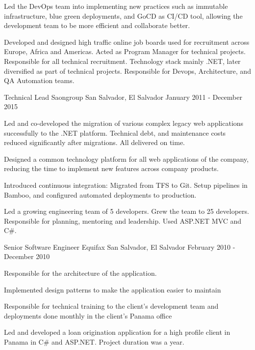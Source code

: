 \begin{cventries}
{\begin{cvitems}
        \item {Led the DevOps team into implementing new practices such as immutable infrastructure, blue green deployments, and GoCD as CI/CD tool, allowing the development team to be more efficient and collaborate better. }
      \end{cvitems}
    }
    {
      \begin{cventrysummary} %
        Developed and designed high traffic online job boards used for recruitment across Europe, Africa and Americas. Acted as Program Manager for technical projects. Responsible for all technical recruitment. Technology stack mainly .NET, later diversified as part of technical projects. Responsible for Devops, Architecture, and QA Automation teams.
      \end{cventrysummary}
    }

  \cventry
    {Technical Lead} %
    {Saongroup}
    {San Salvador, El Salvador}
    {January 2011 - December 2015} %
    {
      \begin{cvitems}
        \item {Led and co-developed the migration of various complex legacy web applications successfully to the .NET platform. Technical debt, and maintenance costs reduced significantly after migrations. All delivered on time.}
        \item {Designed a common technology platform for all web applications of the company, reducing the time to implement new features across company products.}
        \item {Introduced continuous integration: Migrated from TFS to Git. Setup pipelines in Bamboo, and configured automated deployments to production.}
      \end{cvitems}
    }
    {Led a growing engineering team of 5 developers. Grew the team to 25 developers. Responsible for planning, mentoring and leadership. Used ASP.NET MVC and C\#.}

  \cventry
    {Senior Software Engineer} %
    {Equifax} %
    {San Salvador, El Salvador} %
    {February 2010 - December 2010} %
    {
      \begin{cvitems} %
        \item {Responsible for the architecture of the application.}
        \item {Implemented design patterns to make the application easier to maintain}
        \item {Responsible for technical training to the client’s development team and deployments done monthly in the client’s Panama office}
      \end{cvitems}
    }
    {Led and developed a loan origination application for a high profile client in Panama in C\# and ASP.NET. Project duration was a year.}


\end{cventries}
